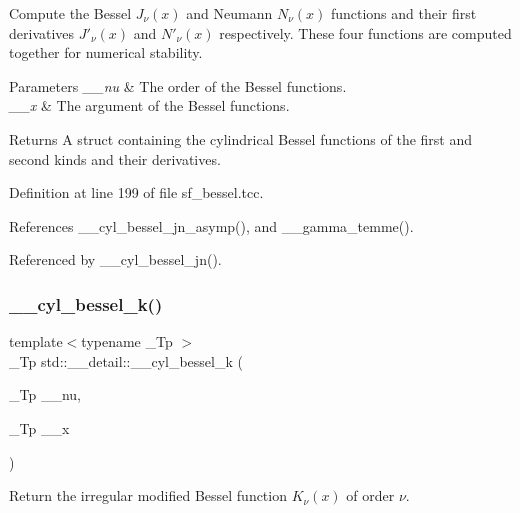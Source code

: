 Compute the Bessel $ J_\nu(x) $ and Neumann $ N_\nu(x) $ functions and their first derivatives $ J'_\nu(x) $ and $ N'_\nu(x) $ respectively. These four functions are computed together for numerical stability. 


\begin{DoxyParams}{Parameters}
{\em \+\_\+\+\_\+nu} & The order of the Bessel functions. \\
\hline
{\em \+\_\+\+\_\+x} & The argument of the Bessel functions. \\
\hline
\end{DoxyParams}
\begin{DoxyReturn}{Returns}
A struct containing the cylindrical Bessel functions of the first and second kinds and their derivatives. 
\end{DoxyReturn}


Definition at line 199 of file sf\+\_\+bessel.\+tcc.



References \+\_\+\+\_\+cyl\+\_\+bessel\+\_\+jn\+\_\+asymp(), and \+\_\+\+\_\+gamma\+\_\+temme().



Referenced by \+\_\+\+\_\+cyl\+\_\+bessel\+\_\+jn().

\mbox{\label{namespacestd_1_1____detail_ac9152f2369a18aa795fe24ccfa6dcf12}} 
\subsubsection{\texorpdfstring{\+\_\+\+\_\+cyl\+\_\+bessel\+\_\+k()}{\_\_cyl\_bessel\_k()}}
{\footnotesize\ttfamily template$<$typename \+\_\+\+Tp $>$ \\
\+\_\+\+Tp std\+::\+\_\+\+\_\+detail\+::\+\_\+\+\_\+cyl\+\_\+bessel\+\_\+k (\begin{DoxyParamCaption}\item[{\+\_\+\+Tp}]{\+\_\+\+\_\+nu,  }\item[{\+\_\+\+Tp}]{\+\_\+\+\_\+x }\end{DoxyParamCaption})}



Return the irregular modified Bessel function $ K_{\nu}(x) $ of order $ \nu $. 

